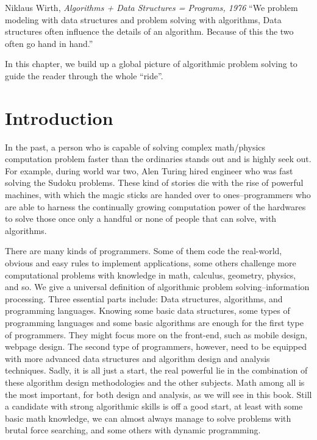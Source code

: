 \documentclass[../main.tex]{subfiles}
\begin{document}
\begin{chapquote}
{Niklaus Wirth, \textit{Algorithms + Data Structures = Programs, 1976}}
``We problem modeling with data structures and problem solving with algorithms, Data structures often influence the details of an algorithm. Because of this the two often go hand in hand.''
\end{chapquote} %

In this chapter, we build up a global picture of algorithmic problem solving  to guide the reader through the whole ``ride''.
%
\section{Introduction}
\label{sec_introduction_introduction}
In the past, a person who is capable of solving  complex math/physics computation problem faster than the ordinaries stands out and is highly seek out. For example, during world war two, Alen Turing hired engineer who was fast solving the Sudoku problems. These kind of stories die with the rise of powerful machines, with which the magic sticks are handed over to ones--programmers who are able to harness the continually growing computation power of the hardwares to solve those once only a handful or none of people that can solve, with algorithms. 

There are many kinds of programmers. Some of them code  the real-world, obvious and easy rules to implement applications, some others challenge more computational problems with  knowledge in math, calculus, geometry, physics, and so. We give a universal definition of algorithmic problem solving--information processing. Three essential parts include: Data structures, algorithms, and programming languages. Knowing some basic data structures, some types of programming languages and some basic algorithms are enough for the first type of programmers. They might focus more on the front-end, such as mobile design, webpage design. The second type of programmers, however, need to be equipped with more advanced data structures and algorithm design and analysis techniques. Sadly, it is all just a start, the real powerful lie in the combination of these algorithm design methodologies and the other subjects. Math among all is the most important, for both design and analysis, as we will see in this book. Still a candidate with strong algorithmic skills is off a good start, at least with some basic math knowledge, we can almost always manage to solve problems with brutal force searching, and some others with dynamic programming. 
\end{document}
